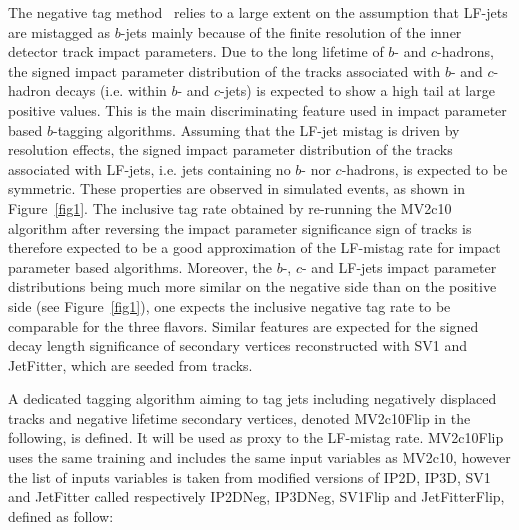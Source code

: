 The negative tag method~\cite{this_work} relies to a large extent on the assumption that LF-jets are mistagged as $b$-jets mainly because of the finite resolution of the inner detector track impact parameters. Due to the long lifetime of $b$- and $c$-hadrons, the signed impact parameter distribution of the tracks associated with $b$- and $c$-hadron decays (i.e. within $b$- and $c$-jets) is expected to show a high tail at large positive values. This is the main discriminating feature used in impact parameter based $b$-tagging algorithms. Assuming that the LF-jet mistag is driven by resolution effects, the signed impact parameter distribution of the tracks associated with LF-jets, i.e. jets containing no $b$- nor $c$-hadrons, is expected to be symmetric. These properties are observed in simulated events, as shown in Figure~\ref{fig1}. The inclusive tag rate obtained by re-running the MV2c10 algorithm after reversing the impact parameter significance sign of tracks is therefore expected to be a good approximation of the LF-mistag rate for impact parameter based algorithms. Moreover, the $b$-, $c$- and LF-jets impact parameter distributions being much more similar on the negative side than on the positive side (see Figure~\ref{fig1}), one expects the inclusive negative tag rate to be comparable for the three flavors. Similar features are expected for the signed decay length significance of secondary vertices reconstructed with SV1 and JetFitter, which are seeded from tracks. 

A dedicated tagging algorithm aiming to tag jets including negatively displaced tracks and negative lifetime secondary vertices, denoted MV2c10Flip in the following, is defined. It will be used as proxy to the LF-mistag rate. MV2c10Flip uses the same training and includes the same input variables as MV2c10, however the list of inputs variables is taken from modified versions of IP2D, IP3D, SV1 and JetFitter called respectively IP2DNeg, IP3DNeg, SV1Flip and JetFitterFlip, defined as follow: 

